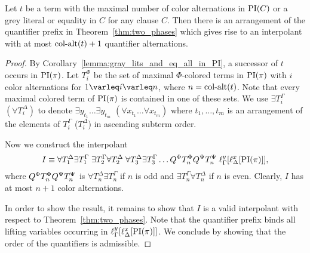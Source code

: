 \begin{lemma}
	\label{lemma:quant_alt_upper_bound}
	Let $t$ be a term with the maximal number of color alternations in $\operatorname{PI}(C)$ or a grey literal or equality in $C$ for any clause $C$.
	Then there is an arrangement of the quantifier prefix in Theorem~\ref{thm:two_phases} which gives rise to an interpolant 
	with at most $\ca(t)+\nolinebreak{}1$ quantifier alternations.
\end{lemma}
\begin{proof}
	By Corollary~\ref{lemma:gray_lits_and_eq_all_in_PI}, a successor of $t$ occurs in $\operatorname{PI}(\pi)$.
	Let $T_i^\Phi$ be the set of maximal $\Phi$-colored terms in $\operatorname{PI}(\pi)$ with $i$ color alternations for $1\varleq i \varleq n$, where $n=\operatorname{col-alt}(t)$.
	Note that every maximal colored term of $\operatorname{PI}(\pi)$ is contained in one of these sets.
	We use $\exists T_i^\Gamma$ $(\forall T_i^\Delta)$ to denote $ \exists y_{t_1} \dots \exists y_{t_m}$ $(\forall x_{t_1}\dots\forall x_{t_m})$ where $t_1, \dots, t_m$ is an arrangement of the elements of $T_i^\Gamma$ ($T_i^\Delta$) in ascending subterm order. 


	Now we construct the interpolant
	\[
		I \equiv 
		\forall T_1^\Delta \exists T_1^\Gamma \;
		\exists T_2^\Gamma \forall T_2^\Delta \;
		\forall T_3^\Delta \exists T_3^\Gamma
		\dots 
		Q^\Phi T_n^\Phi Q^\Psi T_n^\Psi
		\;
		\ell_{\Gamma}^{y}[\ell_{\Delta}^{x}[\operatorname{PI}(\pi)]],
	\]
	where $ Q^\Phi T_n^\Phi Q^\Psi T_n^\Psi $ is
	$\forall T_n^\Delta \exists T_n^\Gamma $ if $n$ is odd and 
	$\exists T_n^\Gamma \forall T_n^\Delta $ if $n$ is even.
	Clearly, $I$ has at most $n+1$ color alternations.

	In order to show the result, it remains to show that $I$ is a valid interpolant with respect to Theorem~\ref{thm:two_phases}. 
	Note that the quantifier prefix binds all lifting variables occurring in  
	$\ell_{\Gamma}^{y}[\ell_{\Delta}^{x}[\operatorname{PI}(\pi)]]$.
	We conclude by showing that the order of the quantifiers is admissible.


\end{proof}
